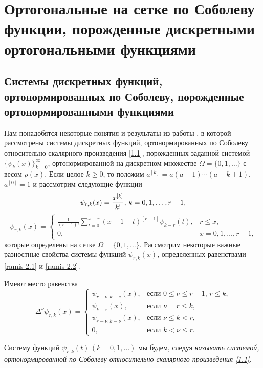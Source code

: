 \chapter{Ортогональные на сетке по Соболеву функции, порожденные дискретными ортогональными функциями}

\section{Системы дискретных функций, ортонормированных по Соболеву, порожденные  ортонормированными  функциями}

Нам понадобятся некоторые понятия и результаты из работы \cite{ramis-shGadj}, в которой рассмотрены системы дискретных функций, ортонормированных по Соболеву относительно скалярного произведения \eqref{1.1}, порожденных заданной системой $\{\psi_k(x)\}_{k=0}^\infty$, ортонормированной на дискретном множестве $\Omega=\{0,1,\ldots\}$ с весом $\rho(x)$.  Если целое $k\ge0$, то положим $a^{[k]}=a(a-1)\cdots (a-k+1)$, $a^{[0]}=1$ и рассмотрим следующие функции
\begin{equation}\label{ramis-2.1}
\psi_{r,k}(x)={x^{[k]}\over k!},\, k=0,1,\ldots,r-1,
\end{equation}
\begin{equation}\label{ramis-2.2}
\psi_{r,k}(x)=\begin{cases}\frac{1}{(r-1)!}\sum\limits_{t=0}^{x-r}(x-1-t)^{[r-1]}\psi_{k-r}(t),
&\text{$r\le x$,}\\ 0,&\text{$x=0,1,\ldots, r-1$,}
\end{cases}
\end{equation}
которые определены на сетке $\Omega=\{0,1,\ldots\}$. Рассмотрим некоторые важные разностные  свойства системы функций $\psi_{r,k}(x)$, определенных равенствами \eqref{ramis-2.1} и \eqref{ramis-2.2}.

\begin{lemma}\label{ramis-RII}
Имеют место равенства
\begin{equation}\label{ramis-2.3}
\Delta^\nu \psi_{r,k}(x)=\begin{cases}\psi_{r-\nu,k-\nu}(x),&\text{если $0\le\nu\le r-1$, $r\le k$,}\\
\psi_{k-r}(x),&\text{если  $\nu=r\le k$,}\\
\psi_{r-\nu,k-\nu}(x),&\text{если $\nu\le k< r$,}\\
0,&\text{если $k< \nu\le r$}.
  \end{cases}
\end{equation}
\end{lemma}
Систему функций $\psi_{r,k}(t)\, (k=0,1,\ldots)$ мы будем, следуя \cite{ramis-shGadj} \textit {называть системой, ортонормированной по Соболеву относительно скалярного произведения \eqref{1.1}.}

